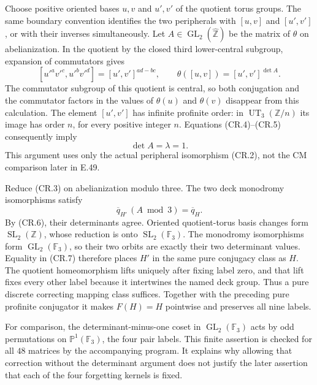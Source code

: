 Choose positive oriented bases $u,v$ and $u',v'$ of the quotient torus
groups.  The same boundary convention identifies the two peripherals
with $[u,v]$ and $[u',v']$, or with their inverses simultaneously.
Let $A\in\operatorname{GL}_2(\widehat{\mathbb Z})$ be the matrix of
$\theta$ on abelianization.  In the quotient by the closed third
lower-central subgroup, expansion of commutators gives
\[
 [u'^{a}v'^{c},u'^{b}v'^{d}]
                   =[u',v']^{ad-bc},\qquad
 \theta([u,v])=[u',v']^{\det A}.                                \tag{CR.5}
\]
The commutator subgroup of this quotient is central, so both
conjugation and the commutator factors in the values of $\theta(u)$
and $\theta(v)$ disappear from this calculation.  The element
$[u',v']$ has infinite profinite order: in
$\operatorname{UT}_3(\mathbb Z/n)$ its image has order $n$, for every
positive integer $n$.  Equations (CR.4)--(CR.5) consequently imply
\[
                             \det A=\lambda=1.                  \tag{CR.6}
\]
This argument uses only the actual peripheral isomorphism (CR.2),
not the CM comparison later in E.49.

Reduce (CR.3) on abelianization modulo three.  The two deck monodromy
isomorphisms satisfy
\[
                  \overline q_{H'}\,(A\bmod3)
                                      =\overline q_H.
                                                               \tag{CR.7}
\]
By (CR.6), their determinants agree.  Oriented quotient-torus basis
changes form $\operatorname{SL}_2(\mathbb Z)$, whose reduction is
onto $\operatorname{SL}_2(\mathbb F_3)$.  The monodromy isomorphisms
form $\operatorname{GL}_2(\mathbb F_3)$, so their two orbits are
exactly their two determinant values.  Equality in (CR.7) therefore
places $H'$ in the same pure conjugacy class as $H$.  The quotient
homeomorphism lifts uniquely after fixing label zero, and that lift
fixes every other label because it intertwines the named deck group.
Thus a pure discrete correcting mapping class suffices.  Together
with the preceding pure profinite conjugator it makes $F(H)=H$
pointwise and preserves all nine labels.

For comparison, the determinant-minus-one coset in
$\operatorname{GL}_2(\mathbb F_3)$ acts by odd permutations on
$\mathbb P^1(\mathbb F_3)$, the four pair labels.  This finite assertion
is checked for all $48$ matrices by the accompanying program.  It
explains why allowing that correction without the determinant
argument does not justify the later assertion that each of the four
forgetting kernels is fixed.

